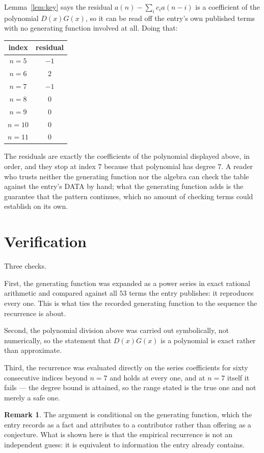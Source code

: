 \documentclass[11pt,a4paper]{article}
\theoremstyle{plain}
\theoremstyle{definition}
\newtheorem{remark}[theorem]{Remark}
\begin{document}
Lemma~\ref{lem:key} says the residual $a(n)-\sum_ic_ia(n-i)$ is a coefficient of the
polynomial $D(x)G(x)$, so it can be read off the entry's own published terms with no
generating function involved at all. Doing that:
\begin{center}
\begin{tabular}{cc}
index & residual \\ \hline
$n=5$ & $-1$ \\
$n=6$ & $2$ \\
$n=7$ & $-1$ \\
$n=8$ & $0$ \\
$n=9$ & $0$ \\
$n=10$ & $0$ \\
$n=11$ & $0$
\end{tabular}
\end{center}
The residuals are exactly the coefficients of the polynomial displayed above, in order, and
they stop at index $7$ because that polynomial has degree $7$. A reader who trusts
neither the generating function nor the algebra can check the table against the entry's DATA
by hand; what the generating function adds is the guarantee that the pattern continues, which
no amount of checking terms could establish on its own.

\section{Verification}

Three checks.

First, the generating function was expanded as a power series in exact rational arithmetic and
compared against all $53$ terms the entry publishes: it reproduces every one. This is
what ties the recorded generating function to the sequence the recurrence is about.

Second, the polynomial division above was carried out symbolically, not numerically, so the
statement that $D(x)G(x)$ is a polynomial is exact rather than approximate.

Third, the recurrence was evaluated directly on the series coefficients for sixty consecutive
indices beyond $n=7$ and holds at every one, and at $n=7$ itself it fails --- the
degree bound is attained, so the range stated is the true one and not merely a safe one.

\begin{remark}
The argument is conditional on the generating function, which the entry records as a fact and
attributes to a contributor rather than offering as a conjecture. What is shown here is that
the empirical recurrence is not an independent guess: it is equivalent to information the
entry already contains.
\end{remark}
\end{document}
